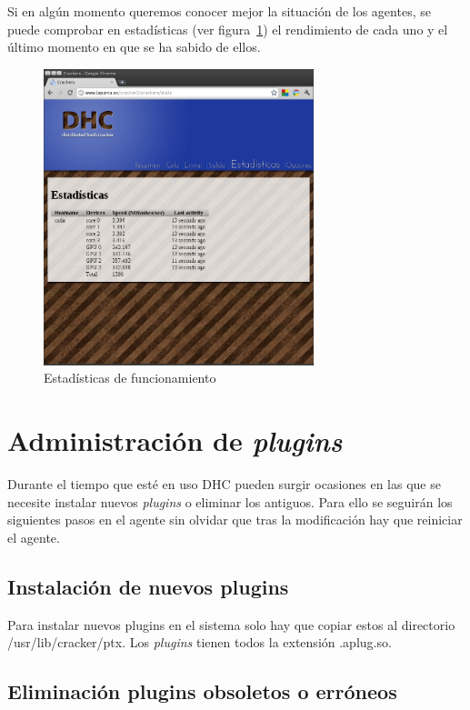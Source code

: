 Si en algún momento queremos conocer mejor la situación de los agentes, se puede comprobar en estadísticas (ver figura~\ref{fig:DHC_estadisticas}) el rendimiento de cada uno y el último momento en que se ha sabido de ellos.

\begin{figure}
	\centering
	\includegraphics[width=0.7\textwidth]{images/estadisticas.png}
	\caption{Estadísticas de funcionamiento}\label{fig:DHC_estadisticas}
\end{figure}

\section{Administración de \emph{plugins}}

Durante el tiempo que esté en uso DHC pueden surgir ocasiones en las que se necesite instalar nuevos \emph{plugins} o eliminar los antiguos.  Para ello se seguirán los siguientes pasos en el agente sin olvidar que tras la modificación hay que reiniciar el agente.

\subsection{Instalación de nuevos plugins}

Para instalar nuevos plugins en el sistema solo hay que copiar estos al directorio /usr/lib/cracker/ptx. Los \emph{plugins} tienen todos la extensión .aplug.so.

\subsection{Eliminación plugins obsoletos o erróneos}


